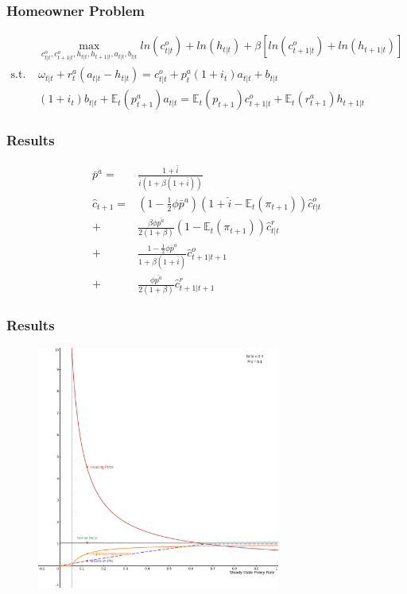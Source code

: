 \documentclass{beamer}
\begin{document}
\begin{frame}
    \frametitle{Homeowner Problem}
    \begin{align}
        &\underset{c^o_{t|t}, c^o_{t+1|t}, h_{t|t}, h_{t+1|t}, a_{t|t}, b_{t|t}}{\max} ln(c^o_{t|t}) + ln(h_{t|t}) + \beta[ln(c^o_{t+1|t}) + ln(h_{t+1|t})] \nonumber \\
        \text{s.t. }& \omega_{t|t} + r^a_t(a_{t|t} - h_{t|t}) = c^o_{t|t} + p^a_t (1 + i_t) a_{t|t} + b_{t|t} \nonumber \\
        & (1 + i_t) b_{t|t} + \mathbb{E}_t (p^a_{t+1}) a_{t|t} = \mathbb{E}_t(p_{t+1})c^o_{t+1|t} + \mathbb{E}_t(r^a_{t+1})h_{t+1|t}
    \end{align}
\end{frame}

\begin{frame}
    \frametitle{Results}
    \begin{align}
        \bar{p}^a =& \frac{1 + \bar{i}}{\bar{i}(1 + \beta(1 + \bar{i}))} \label{ss_housing_price} \\
        \hat{c}_{t+1} =& (1-\frac{1}{2} \phi \bar{p}^a)(1 +\hat{i} - \mathbb{E}_t (\pi_{t+1})) \hat{c}^o_{t|t} \nonumber \\
        +& \frac{\beta \phi \bar{p^a}}{2(1+\beta)} (1 - \mathbb{E}_t(\pi_{t+1})) \hat{c}^r_{t|t} \nonumber \\
        +& \frac{1-\frac{1}{2} \phi \bar{p}^a}{1 + \beta(1+\bar{i})} \hat{c}^o_{t+1|t+1} \nonumber \\
        +& \frac{\phi \bar{p^a}}{2(1+\beta)} \hat{c}^r_{t+1|t+1} \label{is_equation}
    \end{align}
\end{frame}

\begin{frame}
    \frametitle{Results}
    \begin{figure}
        \includegraphics[height=8cm]{images/asset_price_rental_rate.png}
        \centering
    \end{figure}
\end{frame}
\end{document}
